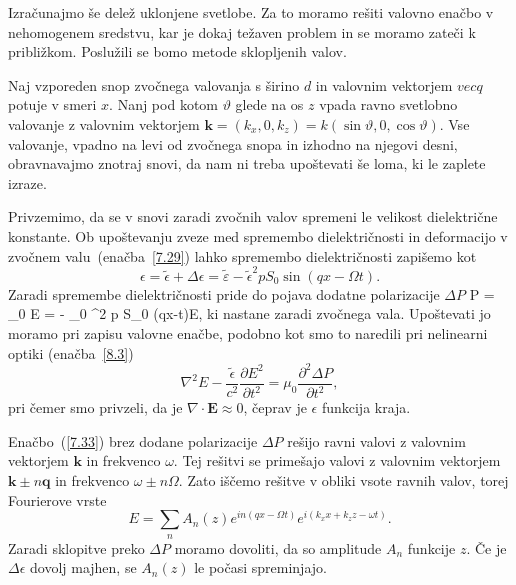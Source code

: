 Izračunajmo še delež uklonjene svetlobe. Za to moramo rešiti 
valovno enačbo v nehomogenem sredstvu, kar je dokaj težaven problem
in se moramo zateči k približkom. Poslužili se bomo metode sklopljenih valov. 

Naj vzporeden snop zvočnega valovanja s širino $d$ in valovnim vektorjem $vec{q}$ potuje v smeri $x$.
Nanj pod kotom $\vartheta$ glede na os $z$ vpada ravno svetlobno valovanje z valovnim vektorjem 
$\mathbf{k}=(k_{x},0,k_{z})= k(\sin\vartheta,0,\cos\vartheta)$.
Vse valovanje, vpadno na levi od zvočnega snopa in izhodno na njegovi desni,
obravnavajmo znotraj snovi, da nam ni treba upoštevati še loma, ki
le zaplete izraze. 

Privzemimo, da se v snovi zaradi zvočnih valov spremeni le velikost
dielektrične konstante. Ob upoštevanju zveze med spremembo dielektričnosti in deformacijo
v zvočnem valu~(enačba~\ref{7.29}) lahko spremembo dielektričnosti
zapišemo kot  
\begin{equation}
\epsilon=\tilde{\epsilon}+\Delta\epsilon = 
\tilde{\varepsilon} -\tilde{\epsilon}^{2}pS_{0}\sin(qx-\Omega t).
\label{7.33}
\end{equation}
Zaradi spremembe dielektričnosti pride do pojava
dodatne polarizacije $\Delta P$
\beq
\Delta P = \varepsilon_0 \Delta \varepsilon E = - \varepsilon_0 \tilde{\varepsilon}^2 p S_0 \sin(qx-\Omega t)E,
\eeq
ki nastane zaradi zvočnega vala. Upoštevati jo moramo pri zapisu valovne enačbe, 
podobno kot smo to naredili pri nelinearni optiki (enačba~\ref{8.3})
\begin{equation}
\nabla^{2}E-\frac{\tilde{\epsilon}}{c^{2}}{\frac{\partial E^{2}}
{\partial t^{2}}}=\mu_{0}{\frac{\partial^2 \Delta P}{\partial t^{2}}},
\label{7.33}
\end{equation}
pri čemer smo privzeli, da je $\nabla\cdot\mathbf{E}\approx 0$, čeprav je
$\epsilon$ funkcija kraja. 

Enačbo~(\ref{7.33}) brez dodane polarizacije $\Delta P$ rešijo ravni valovi 
z valovnim vektorjem $\mathbf{k}$ in frekvenco $\omega$. Tej rešitvi se 
primešajo valovi z valovnim vektorjem $\mathbf{k}\pm n\mathbf{q}$
in frekvenco $\omega\pm n\Omega$. Zato iščemo rešitve v obliki vsote
ravnih valov, torej Fourierove vrste
\begin{equation}
E=\sum_{n}A_{n}(z)e^{in(qx-\Omega t)}e^{i(k_{x}x+k_{z}z-\omega t)}.
\label{7.34}
\end{equation}
Zaradi sklopitve preko $\Delta P$ moramo dovoliti, da so amplitude
$A_{n}$ funkcije $z$. Če je $\Delta\epsilon$ dovolj majhen, se $A_{n}(z)$
le počasi spreminjajo.

